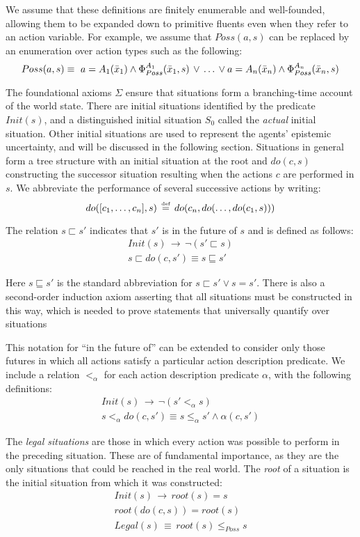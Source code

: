 We assume that these definitions are finitely enumerable and well-founded,
allowing them to be expanded down to primitive fluents even when they
refer to an action variable. For example, we assume that $Poss(a,s)$
can be replaced by an enumeration over action types such as the following:\[
Poss(a,s)\equiv\,\, a=A_{1}(\bar{x}_{1})\wedge\Phi_{Poss}^{A_{1}}(\bar{x}_{1},s)\,\vee\,\dots\,\vee a=A_{n}(\bar{x}_{n})\wedge\Phi_{Poss}^{A_{n}}(\bar{x}_{n},s)\]


The foundational axioms $\Sigma$ ensure that situations form a branching-time
account of the world state. There are initial situations identified
by the predicate $Init(s)$, and a distinguished initial situation
$S_{0}$ called the \emph{actual} initial situation. Other initial
situations are used to represent the agents' epistemic uncertainty,
and will be discussed in the following section. Situations in general
form a tree structure with an initial situation at the root and $do(c,s)$
constructing the successor situation resulting when the actions $c$
are performed in $s$. We abbreviate the performance of several successive
actions by writing:\[
do([c_{1},\dots,c_{n}],s)\,\stackrel{\mbox{\tiny def}}{=}\, do(c_{n},do(\dots,do(c_{1},s)))\]


The relation $s\sqsubset s'$ indicates that $s'$ is in the future
of $s$ and is defined as follows:\begin{gather*}
Init(s)\,\rightarrow\,\neg(s'\sqsubset s)\\
s\sqsubset do(c,s')\equiv s\sqsubseteq s'\end{gather*}


Here $s\sqsubseteq s'$ is the standard abbreviation for $s\sqsubset s'\vee s=s'$.
There is also a second-order induction axiom asserting that all situations
must be constructed in this way, which is needed to prove statements
that universally quantify over situations

This notation for {}``in the future of'' can be extended to consider
only those futures in which all actions satisfy a particular action
description predicate. We include a relation $<_{\alpha}$ for each
action description predicate $\alpha$, with the following definitions:\begin{gather*}
Init(s)\,\rightarrow\,\neg\left(s'<_{\alpha}s\right)\\
s<_{\alpha}do(c,s')\equiv s\leq_{\alpha}s'\wedge\alpha(c,s')\end{gather*}


The \emph{legal situations} are those in which every action was possible
to perform in the preceding situation. These are of fundamental importance,
as they are the only situations that could be reached in the real
world. The \emph{root} of a situation is the initial situation from
which it was constructed:\begin{gather*}
Init(s)\,\rightarrow\, root(s)=s\\
root(do(c,s))=root(s)\\
Legal(s)\,\equiv\, root(s)\leq_{Poss}s\end{gather*}


